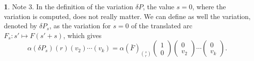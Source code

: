 \documentclass[11pt,reqno]{amsart}
\theoremstyle{definition}
\newtheorem{article}{}
\def \F{{F}}
\def \P{{P}}
\begin{document}
\begin{article}
    {\sc Note 3.} In the definition of the variation 
    $\delta \P$, the value $s=0$, where the variation is computed,
    does not really matter. We can define as well the
    variation, denoted by $\delta\P_s$, as the variation
    for $s=0$ of the translated arc $\F_s: s' \mapsto \F(s'+s)$, 
    which gives
    $$
      \alpha(\delta \P_s)(r)(v_2)\cdots(v_{k}) =
      \alpha(\bar\F)_{s \choose r}\begin{pmatrix}1 \\ 0\end{pmatrix}
      \begin{pmatrix}0 \\ v_2\end{pmatrix} \cdots \begin{pmatrix}0 \\ v_{k}\end{pmatrix}.
      $$
  \end{article} %
  
\end{document}
